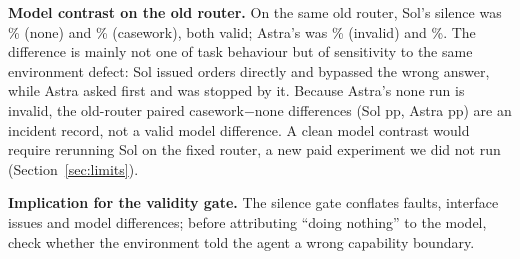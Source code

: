 \documentclass[10pt,twocolumn]{article}
\begin{document}
\textbf{Model contrast on the old router.} On the same old router, Sol's silence was \McSolSilNone\% (none) and \McSolSilCw\% (casework), both valid; Astra's was \ArOldSilNone\% (invalid) and \ArOldSilCw\%. The difference is mainly not one of task behaviour but of sensitivity to the same environment defect: Sol issued orders directly and bypassed the wrong answer, while Astra asked first and was stopped by it. Because Astra's none run is invalid, the old-router paired casework$-$none differences (Sol \McSolPIv{} pp, Astra \ArOldPIv{} pp) are an incident record, not a valid model difference. A clean model contrast would require rerunning Sol on the fixed router, a new paid experiment we did not run (Section~\ref{sec:limits}).

\textbf{Implication for the validity gate.} The silence gate conflates faults, interface issues and model differences; before attributing ``doing nothing'' to the model, check whether the environment told the agent a wrong capability boundary.
\end{document}
